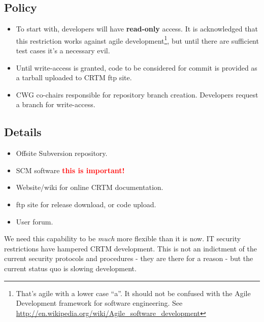 \subsection{Policy}
\begin{itemize}
  \item To start with, developers will have \textbf{read-only} access. It is acknowledged that this restriction works against agile development\footnote{That's agile with a lower case ``a''. It should not be confused with the Agile Development framework for software engineering. See \href{http://en.wikipedia.org/wiki/Agile_software_development}{http://en.wikipedia.org/wiki/Agile\_software\_development}}, but until there are sufficient test cases it's a necessary evil.
  \item Until write-access is granted, code to be considered for commit is provided as a tarball uploaded to CRTM ftp site.
  \item CWG co-chairs responsible for repository branch creation. Developers request a branch for write-access.
\end{itemize}

\subsection{Details}
\begin{itemize}
  \item Offsite Subversion repository.
  \item SCM software \textcolor{red}{\textbf{this is important!}}
  \item Website/wiki for online CRTM documentation.
  \item ftp site for release download, or code upload.
  \item User forum.
\end{itemize}
We need this capability to be \emph{much} more flexible than it is now. IT security restrictions have hampered CRTM development. This is not an indictment of the current security protocols and procedures - they are there for a reason - but the current status quo is slowing development.


